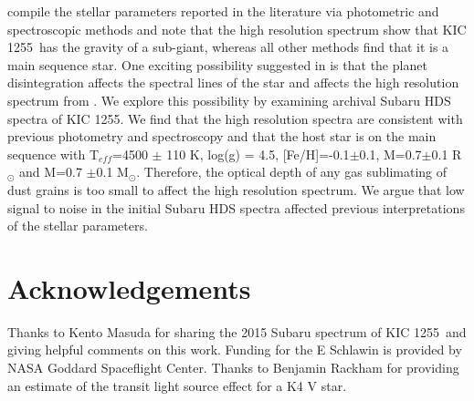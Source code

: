 \documentclass[preprint]{aastex61}
\newcommand{\shStar}{KIC 1255}
\begin{document}
\citet{vanlieshout2016kic1255} compile the stellar parameters reported in the literature via photometric and spectroscopic methods and note that the high resolution spectrum show that \shStar\ has the gravity of a sub-giant, whereas all other methods find that it is a main sequence star.
One exciting possibility suggested in \citet{vanlieshout2016kic1255} is that the planet disintegration affects the spectral lines of the star and affects the high resolution spectrum from \citet{kawahara2013starspots}.
We explore this possibility by examining archival Subaru HDS spectra of \shStar.
We find that the high resolution spectra are consistent with previous photometry and spectroscopy and that the host star is on the main sequence with T$_{eff}$=4500 $\pm$ 110 K, log(g) = 4.5, [Fe/H]=-0.1$\pm$0.1, M=0.7$\pm$0.1 R$_\odot$ and M=0.7 $\pm$0.1 M$_\odot$.
Therefore, the optical depth of any gas sublimating of dust grains is too small to affect the high resolution spectrum.
We argue that low signal to noise in the initial Subaru HDS spectra affected previous interpretations of the stellar parameters.


\section{Acknowledgements}
Thanks to Kento Masuda for sharing the 2015 Subaru spectrum of \shStar\ and giving helpful comments on this work.
Funding for the E Schlawin is provided by NASA Goddard Spaceflight Center.
Thanks to Benjamin Rackham for providing an estimate of the transit light source effect for a K4 V star.


\end{document}
